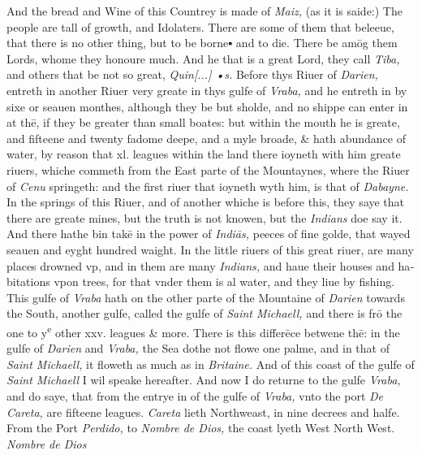 \documentclass[11pt,twoside]{article}\makeatletter
\def\gap{}
\begin{document}
 And the bread and Wine of this Countrey is made of {\itshape Maiz,} (as it is saide:) The people are tall of growth, and Idolaters. There are some of them that beleeue, that there is no other thing, but to be borne▪ and to die. There be amōg them Lords, whome they honoure much. And he that is a great Lord, they call {\itshape Tiba,} and others that be not so great, {\itshape Quin[...] {\gap •}s.} Before thys Riuer of {\itshape Darien,} entreth in another Riuer very greate in thys gulfe of {\itshape Vraba,} and he entreth in by sixe or seauen monthes, 
	\normalmarginpar
       although they be but sholde, and no shippe can enter in at thē, if they be greater than small boates: but within the mouth he is greate, and fifteene and twenty fadome deepe, and a myle broade, \& hath abundance of water, by reason that xl. leagues within the land there ioyneth with him greate riuers, whiche commeth from the East parte of the Mountaynes, where the Riuer of {\itshape Cenu} springeth: and the first riuer that ioyneth wyth him, is that of {\itshape Dabayne.} In the springs of this Riuer, and of another whiche is before this, they saye that there are greate mines, but the truth is not knowen, but the {\itshape Indians} doe say it. And there hathe bin takē in the power of {\itshape Indiās,} peeces of fine golde, that wayed seauen and eyght hundred waight. In the little riuers of this great riuer, are many places drowned vp, and in them are many {\itshape Indians,} and haue their houses and ha­bitations vpon trees, for that vnder them is al water, and they liue by fishing. This gulfe of {\itshape Vraba} hath on the other parte of the Mountaine of {\itshape Darien} towards the South, another gulfe, called the gulfe of {\itshape Saint Michaell,} and there is frō the one to y\textsuperscript{e} other xxv. leagues \& more. There is this differēce betwene thē: 
	\normalmarginpar
       in the gulfe of {\itshape Darien} and {\itshape Vraba,} the Sea dothe not flowe one palme, and in that of {\itshape Saint Michaell,} it floweth as much as in {\itshape Britaine.} And of this coast of the gulfe of {\itshape Saint Michaell} I wil speake hereafter. And now I do returne to the gulfe {\itshape Vraba,} and do saye, that from the entrye in of the gulfe of {\itshape Vraba,} vnto the port {\itshape De Careta,} are fifteene leagues. {\itshape Careta} lieth Northweast, 
	\normalmarginpar
       in nine decrees and halfe. From the Port {\itshape Perdido,} to {\itshape Nombre de Dios,} the coast lyeth West North West. {\itshape Nombre de Dios} %
\end{document}
